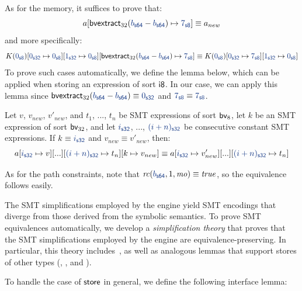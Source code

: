As for the memory, it suffices to prove that:
\[ \arraystore{\arrayvalue}{\bvextract{32}{\bvconst{64}{\addr} - \bvconst{64}{\addr}}}{\bvconst{8}{7}} \equiv \arrayvalue_{new} \]
and more specifically:
\[
  \arraystore{\arraystore{\arraystore{\arrayconst{\arrayinitvalue}}{\bvconst{32}{0}}{\arrayinitvalue}}{\bvconst{32}{1}}{\arrayinitvalue}}{\bvextract{32}{\bvconst{64}{\addr} - \bvconst{64}{\addr}}}{\bvconst{8}{7}} \equiv
  \arraystore{\arraystore{\arrayconst{\arrayinitvalue}}{\bvconst{32}{0}}{\bvconst{8}{7}}}{\bvconst{32}{1}}{\arrayinitvalue}
\]
To prove such cases automatically, we define the lemma below, which can be applied when storing an expression of sort $\textsf{i8}$.
In our case, we can apply this lemma since $\bvextract{32}{\bvsub{\bvsort{64}}{\bvconst{64}{\addr}}{\bvconst{64}{\addr}}} \equiv \bvconst{32}{0}$ and $\bvconst{8}{7} \equiv \bvconst{8}{7}$.
\begin{lemma}
\label{lemma:store-i8}
Let $v$, $v_{new}$, $v'_{new}$, and $t_1$, ..., $t_n$ be SMT expressions of sort $\textsf{bv}_{8}$,
let $k$ be an SMT expression of sort $\textsf{bv}_{32}$,
and let $\bvconst{32}{i}$, ..., $\bvconst{32}{(i + n)}$ be consecutive constant SMT expressions.
If $k \equiv \bvconst{32}{i}$ and $v_{new} \equiv v'_{new}$, then:
\[ \arraystore{\arraystore{\arraystore{a}{\bvconst{32}{i}}{v}[...]}{\bvconst{32}{(i + n)}}{t_n}}{k}{v_{new}} \equiv \arraystore{\arraystore{a}{\bvconst{32}{i}}{v'_{new}}[...]}{\bvconst{32}{(i + n)}}{t_n} \]
\end{lemma}

As for the path constraints,
note that $\rangecond(\bvconst{64}{\addr}, 1, \mo) \equiv \true$, so the equivalence follows easily.

The SMT simplifications employed by the \SE engine yield SMT encodings that diverge from those derived from the symbolic semantics.
To prove SMT equivalences automatically,
we develop a \emph{simplification theory} that proves that the SMT simplifications employed by the \SE engine are equivalence-preserving.
In particular, this theory includes~,
as well as analogous lemmas that support stores of other types (, , and ).

To handle the case of $\textsf{store}$ in general, we define the following interface lemma:

